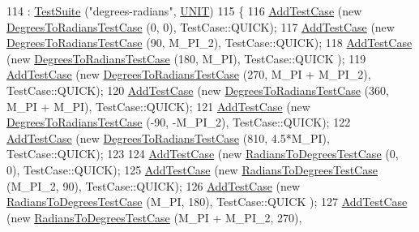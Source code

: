 \begin{DoxyCode}
114   : \hyperlink{classns3_1_1TestSuite_a904b0c40583b744d30908aeb94636d1a}{TestSuite} (\textcolor{stringliteral}{"degrees-radians"}, \hyperlink{classns3_1_1TestSuite_a1ebfcab34ec8161e085e8e3a1855eae0a3885375a3787abf60431f8454b3cadbd}{UNIT})
115 \{
116   \hyperlink{classns3_1_1TestCase_a3718088e3eefd5d6454569d2e0ddd835}{AddTestCase} (\textcolor{keyword}{new} \hyperlink{classDegreesToRadiansTestCase}{DegreesToRadiansTestCase} (0, 0), TestCase::QUICK);
117   \hyperlink{classns3_1_1TestCase_a3718088e3eefd5d6454569d2e0ddd835}{AddTestCase} (\textcolor{keyword}{new} \hyperlink{classDegreesToRadiansTestCase}{DegreesToRadiansTestCase} (90, M\_PI\_2), 
      TestCase::QUICK);
118   \hyperlink{classns3_1_1TestCase_a3718088e3eefd5d6454569d2e0ddd835}{AddTestCase} (\textcolor{keyword}{new} \hyperlink{classDegreesToRadiansTestCase}{DegreesToRadiansTestCase} (180, M\_PI), TestCase::QUICK
      );
119   \hyperlink{classns3_1_1TestCase_a3718088e3eefd5d6454569d2e0ddd835}{AddTestCase} (\textcolor{keyword}{new} \hyperlink{classDegreesToRadiansTestCase}{DegreesToRadiansTestCase} (270, M\_PI + M\_PI\_2), 
      TestCase::QUICK);
120   \hyperlink{classns3_1_1TestCase_a3718088e3eefd5d6454569d2e0ddd835}{AddTestCase} (\textcolor{keyword}{new} \hyperlink{classDegreesToRadiansTestCase}{DegreesToRadiansTestCase} (360, M\_PI + M\_PI), 
      TestCase::QUICK);
121   \hyperlink{classns3_1_1TestCase_a3718088e3eefd5d6454569d2e0ddd835}{AddTestCase} (\textcolor{keyword}{new} \hyperlink{classDegreesToRadiansTestCase}{DegreesToRadiansTestCase} (-90, -M\_PI\_2), 
      TestCase::QUICK);
122   \hyperlink{classns3_1_1TestCase_a3718088e3eefd5d6454569d2e0ddd835}{AddTestCase} (\textcolor{keyword}{new} \hyperlink{classDegreesToRadiansTestCase}{DegreesToRadiansTestCase} (810, 4.5*M\_PI), 
      TestCase::QUICK);
123 
124   \hyperlink{classns3_1_1TestCase_a3718088e3eefd5d6454569d2e0ddd835}{AddTestCase} (\textcolor{keyword}{new} \hyperlink{classRadiansToDegreesTestCase}{RadiansToDegreesTestCase} (0, 0), TestCase::QUICK);
125   \hyperlink{classns3_1_1TestCase_a3718088e3eefd5d6454569d2e0ddd835}{AddTestCase} (\textcolor{keyword}{new} \hyperlink{classRadiansToDegreesTestCase}{RadiansToDegreesTestCase} (M\_PI\_2, 90), 
      TestCase::QUICK);
126   \hyperlink{classns3_1_1TestCase_a3718088e3eefd5d6454569d2e0ddd835}{AddTestCase} (\textcolor{keyword}{new} \hyperlink{classRadiansToDegreesTestCase}{RadiansToDegreesTestCase} (M\_PI, 180), TestCase::QUICK
      );
127   \hyperlink{classns3_1_1TestCase_a3718088e3eefd5d6454569d2e0ddd835}{AddTestCase} (\textcolor{keyword}{new} \hyperlink{classRadiansToDegreesTestCase}{RadiansToDegreesTestCase} (M\_PI + M\_PI\_2, 270), 

\end{DoxyCode}
